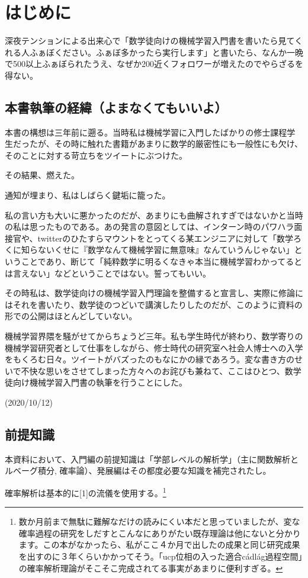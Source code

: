 \documentclass{jsarticle}
\begin{document}
\newpage
\section{はじめに}

深夜テンションによる出来心で「数学徒向けの機械学習入門書を書いたら見てくれる人ふぁぼください。ふぁぼ多かったら実行します」と書いたら、なんか一晩で500以上ふぁぼられたうえ、なぜか200近くフォロワーが増えたのでやらざるを得ない。

\subsection{本書執筆の経緯（よまなくてもいいよ）}

本書の構想は三年前に遡る。当時私は機械学習に入門したばかりの修士課程学生だったが、その時に触れた書籍があまりに数学的厳密性にも一般性にも欠け、そのことに対する苛立ちをツイートにぶつけた。

その結果、燃えた。

通知が埋まり、私はしばらく鍵垢に籠った。

私の言い方も大いに悪かったのだが、あまりにも曲解されすぎではないかと当時の私は思ったものである。あの発言の意図としては、インターン時のパワハラ面接官や、twitterのひたすらマウントをとってくる某エンジニアに対して「数学ろくに知らないくせに『数学なんて機械学習に無意味』なんていうんじゃない」ということであり、断じて「純粋数学に明るくなきゃ本当に機械学習わかってるとは言えない」などということではない。誓ってもいい。

その時私は、数学徒向けの機械学習入門理論を整備すると宣言し、実際に修論にはそれを書いたり、数学徒のつどいで講演したりしたのだが、このように資料の形での公開はほとんどしていない。

機械学習界隈を騒がせてからちょうど三年。私も学生時代が終わり、数学寄りの機械学習研究者として仕事をしながら、修士時代の研究室へ社会人博士への入学をもくろむ日々。ツイートがバズったのもなにかの縁であろう。変な書き方のせいで不快な思いをさせてしまった方々へのお詫びも兼ねて、ここはひとつ、数学徒向け機械学習入門書の執筆を行うことにした。

(2020/10/12)

\subsection{前提知識}
本資料において、入門編の前提知識は「学部レベルの解析学」（主に関数解析とルベーグ積分,
確率論）、発展編はその都度必要な知識を補完されたし。

確率解析は基本的に[1]の流儀を使用する。\footnote{数か月前まで無駄に難解なだけの読みにくい本だと思っていましたが、変な確率過程の研究をしだすとこんなにありがたい既存理論は他にないと分かります。この本がなかったら、私がここ４か月で出したの成果と同じ研究成果を出すのに３年くらいかかってそう。「ucp位相の入った適合c\'{a}dl\'{a}g過程空間」の確率解析理論がそこそこ完成されてる事実があまりに便利すぎる。}
\end{document}

